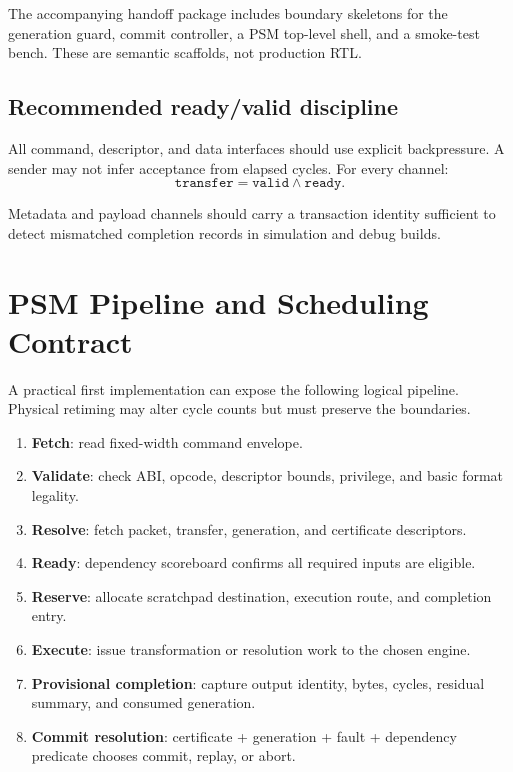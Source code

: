 \documentclass[10pt,letterpaper]{article}
\begin{document}
{{{The accompanying handoff package includes boundary skeletons for the generation guard, commit controller, a PSM top-level shell, and a smoke-test bench. These are semantic scaffolds, not production RTL.

\subsection{Recommended ready/valid discipline}

All command, descriptor, and data interfaces should use explicit backpressure. A sender may not infer acceptance from elapsed cycles. For every channel:
\[
\texttt{transfer}=\texttt{valid}\land\texttt{ready}.
\]

Metadata and payload channels should carry a transaction identity sufficient to detect mismatched completion records in simulation and debug builds.

\section{PSM Pipeline and Scheduling Contract}

A practical first implementation can expose the following logical pipeline. Physical retiming may alter cycle counts but must preserve the boundaries.

\begin{enumerate}
\item \textbf{Fetch}: read fixed-width command envelope.
\item \textbf{Validate}: check ABI, opcode, descriptor bounds, privilege, and basic format legality.
\item \textbf{Resolve}: fetch packet, transfer, generation, and certificate descriptors.
\item \textbf{Ready}: dependency scoreboard confirms all required inputs are eligible.
\item \textbf{Reserve}: allocate scratchpad destination, execution route, and completion entry.
\item \textbf{Execute}: issue transformation or resolution work to the chosen engine.
\item \textbf{Provisional completion}: capture output identity, bytes, cycles, residual summary, and consumed generation.
\item \textbf{Commit resolution}: certificate + generation + fault + dependency predicate chooses commit, replay, or abort.
\end{enumerate}

}}}
\end{document}

